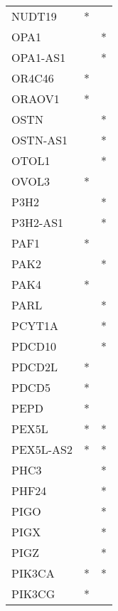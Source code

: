 \begin{longtable}{lcc}
NUDT19           &              * &            \\
OPA1             &                &          * \\
OPA1-AS1         &                &          * \\
OR4C46           &              * &            \\
ORAOV1           &              * &            \\
OSTN             &                &          * \\
OSTN-AS1         &                &          * \\
OTOL1            &                &          * \\
OVOL3            &              * &            \\
P3H2             &                &          * \\
P3H2-AS1         &                &          * \\
PAF1             &              * &            \\
PAK2             &                &          * \\
PAK4             &              * &            \\
PARL             &                &          * \\
PCYT1A           &                &          * \\
PDCD10           &                &          * \\
PDCD2L           &              * &            \\
PDCD5            &              * &            \\
PEPD             &              * &            \\
PEX5L            &              * &          * \\
PEX5L-AS2        &              * &          * \\
PHC3             &                &          * \\
PHF24            &                &          * \\
PIGO             &                &          * \\
PIGX             &                &          * \\
PIGZ             &                &          * \\
PIK3CA           &              * &          * \\
PIK3CG           &              * &            \\

\end{longtable}

